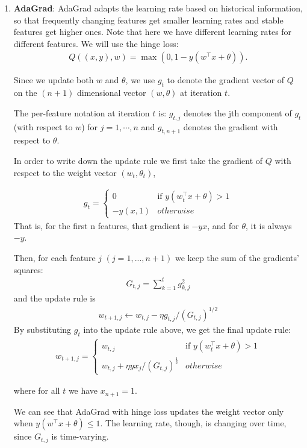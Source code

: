 \begin{enumerate}
\item {\bf AdaGrad}: AdaGrad adapts the learning rate based on historical information, so that frequently changing features get smaller learning rates and stable features get higher ones. Note that here we have different learning rates for different features. We will use the hinge loss:
\begin{align*}
Q((x,y),w) = \max(0,1-y(w^\intercal x+\theta)).
\end{align*}

Since we update both $w$ and $\theta$, we use $g_t$ to denote the gradient vector of $Q$ on the $(n + 1)$ dimensional vector $(w, \theta)$ at iteration $t$.

The per-feature notation at iteration $t$ is: $g_{t,j}$ denotes the jth component of $g_t$ (with respect to $w$) for $j = 1, \cdots, n$ and $g_{t,n+1}$ denotes the gradient with respect to $\theta$.

In order to write down the update rule we first take the gradient of $Q$ with respect to the weight vector $(w_t, \theta_t)$,

\begin{align*}
g_t=
\begin{cases}
0 & \text{if $y(w_t^\intercal x + \theta) > 1$} \\
-y(x,1) & otherwise
\end{cases}
\end{align*}
That is, for the first n features, that gradient is $-yx$, and for $\theta$, it is always $-y$.

Then, for each feature $j$ $(j = 1, ..., n + 1)$ we keep the sum of the gradients' squares:
\begin{align*}
G_{t,j} = \sum_{k=1}^t g^2_{k,j}
\end{align*}
and the update rule is
\begin{align*}
w_{t+1,j} \leftarrow w_{t,j} -\eta g_{t,j}/(G_{t,j})^{1/2}
\end{align*}
By substituting $g_t$ into the update rule above, we get the final update rule:
\begin{align*}
w_{t+1,j} =
\begin{cases}
w_{t,j} & \text{if $y(w_t^\intercal x + \theta) > 1$} \\
w_{t,j}+\eta yx_j/(G_{t,j})^{\frac{1}{2}} & otherwise
\end{cases}
\end{align*}

where for all $t$ we have $x_{n+1}=1$.

We can see that AdaGrad with hinge loss updates the weight vector only
when $y(w^\intercal x+\theta) \le 1$. The learning rate, though, is changing
over time, since $G_{t,j}$ is time-varying.


\end{enumerate}
